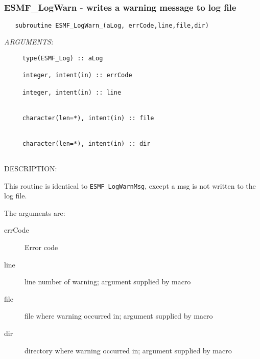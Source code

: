  
\mbox{}\hrulefill\ 
 
\subsubsection [ESMF\_LogWarn] {ESMF\_LogWarn - writes a warning message to log file}


 
\begin{verbatim}   subroutine ESMF_LogWarn_(aLog, errCode,line,file,dir)
 \end{verbatim}{\em ARGUMENTS:}
\begin{verbatim}     type(ESMF_Log) :: aLog
 
     integer, intent(in) :: errCode         
 
     integer, intent(in) :: line            
                                          
 
     character(len=*), intent(in) :: file   
                                            
 
     character(len=*), intent(in) :: dir    
                                          
 \end{verbatim}
{\sf DESCRIPTION:\\ }


     This routine is identical to {\tt ESMF\_LogWarnMsg}, except a msg is
     not written to the log file.
  
     The arguments are:
     \begin{description}
  
     \item[errCode]
     Error code
  
     \item[line]
     line number of warning; argument supplied by macro
  
     \item[file]
     file where warning occurred in; argument supplied by macro
  
     \item[dir]
     directory where warning occurred in; argument supplied by macro
  
     \end{description}
   
 
\mbox{}\hrulefill\ 
 
